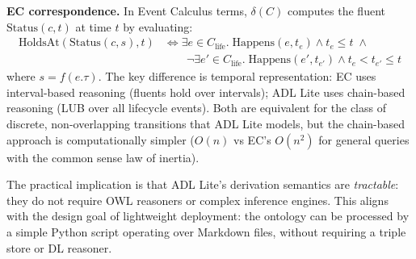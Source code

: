 \textbf{EC correspondence.} In Event Calculus terms, $\delta(C)$ computes the fluent $\text{Status}(c, t)$ at time $t$ by evaluating:
\begin{align}
    \text{HoldsAt}(\text{Status}(c, s), t) &\iff \exists e \in C_{\text{life}}.\; \text{Happens}(e, t_e) \land t_e \leq t \; \land \\
    &\qquad \neg \exists e' \in C_{\text{life}}.\; \text{Happens}(e', t_{e'}) \land t_e < t_{e'} \leq t
\end{align}
where $s = f(e.\tau)$. The key difference is temporal representation: EC uses interval-based reasoning (fluents hold over intervals); ADL Lite uses chain-based reasoning (LUB over all lifecycle events). Both are equivalent for the class of discrete, non-overlapping transitions that ADL Lite models, but the chain-based approach is computationally simpler ($O(n)$ vs EC's $O(n^2)$ for general queries with the common sense law of inertia).

The practical implication is that ADL Lite's derivation semantics are \emph{tractable}: they do not require OWL reasoners or complex inference engines. This aligns with the design goal of lightweight deployment: the ontology can be processed by a simple Python script operating over Markdown files, without requiring a triple store or DL reasoner.
